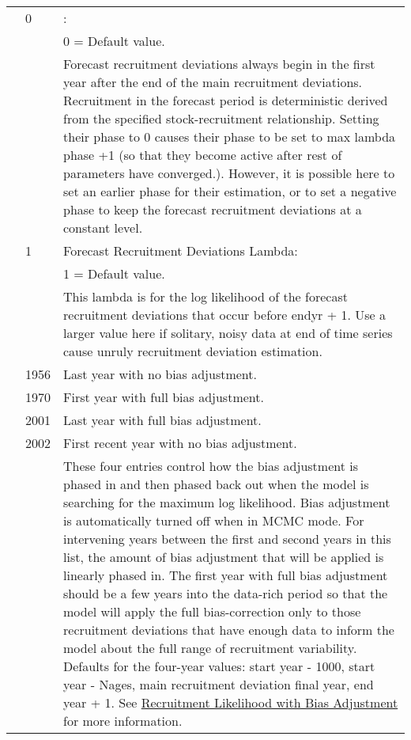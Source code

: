 \begin{longtable}{p{1cm} p{3cm} p{11cm}}
	\Tstrut & 0 & \raisebox{0.1\ht\strutbox}{\hypertarget{FcastRecDevPhase}{Forecast Recruitment Deviations Phase}}: \\
			&   & 0 = Default value. \\
			&   & Forecast recruitment deviations always begin in the first year after the end of the main recruitment deviations. Recruitment in the forecast period is deterministic derived from the specified stock-recruitment relationship. Setting their phase to 0 causes their phase to be set to max lambda phase +1 (so that they become active after rest of parameters have converged.). However, it is possible here to set an earlier phase for their estimation, or to set a negative phase to keep the forecast recruitment deviations at a constant level. \Bstrut\\

	\Tstrut & 1 & Forecast Recruitment Deviations Lambda: \\
			&   & 1 = Default value. \\
			&   & This lambda is for the log likelihood of the forecast recruitment deviations that occur before endyr + 1. Use a larger value here if solitary, noisy data at end of time series cause unruly recruitment deviation estimation. \\
	
	\Tstrut & 1956 & Last year with no bias adjustment. \\
			& 1970 & First year with full bias adjustment. \\
			& 2001 & Last year with full bias adjustment. \\
			& 2002 & First recent year with no bias adjustment. \\
			& 	   & These four entries control how the bias adjustment is phased in and then phased back out when the model is searching for the maximum log likelihood. Bias adjustment is automatically turned off when in MCMC mode. For intervening years between the first and second years in this list, the amount of bias adjustment that will be applied is linearly phased in. The first year with full bias adjustment should be a few years into the data-rich period so that the model will apply the full bias-correction only to those recruitment deviations that have enough data to inform the model about the full range of recruitment variability. Defaults for the four-year values: start year - 1000, start year - Nages, main recruitment deviation final year, end year + 1. See \hyperlink{RecBias}{Recruitment Likelihood with Bias Adjustment} for more information. \\
	

\end{longtable}
